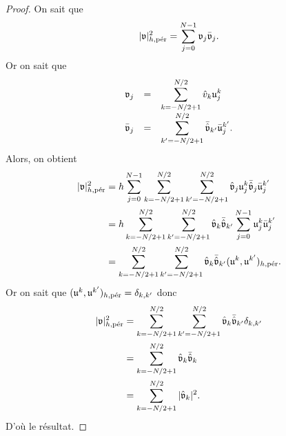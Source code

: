 \begin{proof}
On sait que 
\begin{equation}
|\mathfrak{v}|_{h,\per}^2 = \gsum_{j=0}^{N-1} \mathfrak{v}_j \bar{\mathfrak{v}}_j.
\end{equation}
Or on sait que
\begin{equation}
\begin{array}{rcl}
\mathfrak{v}_j & = & \gsum_{k = -N/2+1}^{N/2} \hat{v}_k \mathfrak{u}_j^k \\
\bar{\mathfrak{v}}_j & = & \gsum_{k' = -N/2+1}^{N/2} \bar{\hat{\mathfrak{v}}}_{k'} \bar{\mathfrak{u}}_j^{k'}.
\end{array}
\end{equation}
Alors, on obtient
\begin{align*}
|\mathfrak{v}|_{h,\per}^2 & = h \gsum_{j=0}^{N-1} \gsum_{k=-N/2+1}^{N/2} \gsum_{k'=-N/2+1}^{N/2} \hat{\mathfrak{v}}_j \mathfrak{u}_j^k \bar{\hat{\mathfrak{v}}}_j \bar{\mathfrak{u}}_j^{k'} \\
	& = h \gsum_{k=-N/2+1}^{N/2} \gsum_{k'=-N/2+1}^{N/2} \hat{\mathfrak{v}}_k \bar{\hat{\mathfrak{v}}}_{k'} \gsum_{j=0}^{N-1} \mathfrak{u}_j^k \bar{\mathfrak{u}}_j^{k'} \\
	& = \gsum_{k=-N/2+1}^{N/2} \gsum_{k'=-N/2+1}^{N/2} \hat{\mathfrak{v}}_k \bar{\hat{\mathfrak{v}}}_{k'} (\mathfrak{u}^k, \mathfrak{u}^{k'})_{h,\per}.
\end{align*}
Or on sait que $(\mathfrak{u}^k, \mathfrak{u}^{k'})_{h,\per} = \delta_{k,k'}$ donc
\begin{align*}
|\mathfrak{v}|_{h,\per}^2 & = \gsum_{k=-N/2+1}^{N/2} \gsum_{k'=-N/2+1}^{N/2} \hat{\mathfrak{v}}_k \bar{\hat{\mathfrak{v}}}_{k'} \delta_{k,k'}\\
	& = \gsum_{k=-N/2+1}^{N/2} \hat{\mathfrak{v}}_k \bar{\hat{\mathfrak{v}}}_k \\
	& = \gsum_{k=-N/2+1}^{N/2} |\hat{\mathfrak{v}}_k|^2.
\end{align*}
D'où le résultat.
\end{proof}


















